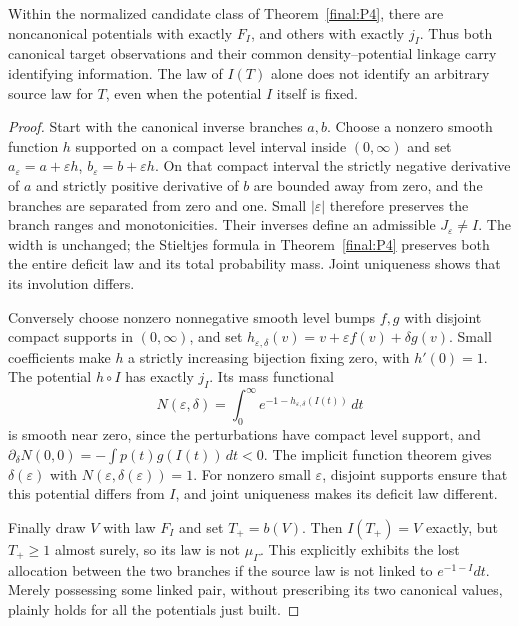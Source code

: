 \begin{proposition}
\label{final:P4-boundaries}
Within the normalized candidate class of Theorem~\ref{final:P4},
there are noncanonical potentials with exactly $F_I$, and others
with exactly $j_I$.  Thus both canonical target observations and
their common density--potential linkage carry identifying information.
The law of $I(T)$ alone does not identify an arbitrary source law
for $T$, even when the potential $I$ itself is fixed.
\end{proposition}
\begin{proof}
Start with the canonical inverse branches $a,b$.  Choose a nonzero
smooth function $h$ supported on a compact level interval inside
$(0,\infty)$ and set $a_\varepsilon=a+\varepsilon h$,
$b_\varepsilon=b+\varepsilon h$.  On that compact interval the
strictly negative derivative of $a$ and strictly positive derivative
of $b$ are bounded away from zero, and the branches are separated
from zero and one.  Small $|\varepsilon|$ therefore preserves the
branch ranges and monotonicities.  Their inverses define an
admissible $J_\varepsilon\neq I$.  The width is unchanged; the
Stieltjes formula in Theorem~\ref{final:P4} preserves both the entire
deficit law and its total probability mass.  Joint uniqueness shows
that its involution differs.

Conversely choose nonzero nonnegative smooth level bumps $f,g$ with
disjoint compact supports in $(0,\infty)$, and set
$h_{\varepsilon,\delta}(v)=v+\varepsilon f(v)+\delta g(v)$.
Small coefficients make $h$ a strictly increasing bijection fixing
zero, with $h'(0)=1$.  The potential $h\circ I$ has exactly $j_I$.
Its mass functional
\[
 N(\varepsilon,\delta)=
 \int_0^\infty e^{-1-h_{\varepsilon,\delta}(I(t))}\,dt
\]
is smooth near zero, since the perturbations have compact level
support, and
$\partial_\delta N(0,0)=-\int p(t)g(I(t))\,dt<0$.
The implicit function theorem gives $\delta(\varepsilon)$ with
$N(\varepsilon,\delta(\varepsilon))=1$.  For nonzero small
$\varepsilon$, disjoint supports ensure that this potential differs
from $I$, and joint uniqueness makes its deficit law different.

Finally draw $V$ with law $F_I$ and set $T_+=b(V)$.  Then
$I(T_+)=V$ exactly, but $T_+\geq1$ almost surely, so its law is not
$\mu_\Gamma$.  This explicitly exhibits the lost allocation between
the two branches if the source law is not linked to $e^{-1-I}dt$.
Merely possessing some linked pair, without prescribing its two
canonical values, plainly holds for all the potentials just built.
\end{proof}

